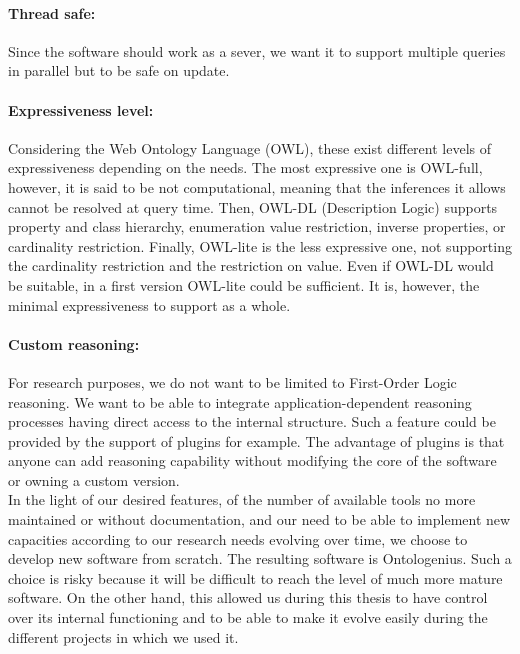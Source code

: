 \paragraph{Thread safe:} Since the software should work as a sever, we want it to support multiple queries in parallel but to be safe on update.

\paragraph{Expressiveness level:} Considering the Web Ontology Language (OWL), these exist different levels of expressiveness depending on the needs. The most expressive one is OWL-full, however, it is said to be not computational, meaning that the inferences it allows cannot be resolved at query time. Then, OWL-DL (Description Logic) supports property and class hierarchy, enumeration value restriction, inverse properties, or cardinality restriction. Finally, OWL-lite is the less expressive one, not supporting the cardinality restriction and the restriction on value. Even if OWL-DL would be suitable, in a first version OWL-lite could be sufficient. It is, however, the minimal expressiveness to support as a whole.

\paragraph{Custom reasoning:} For research purposes, we do not want to be limited to First-Order Logic reasoning. We want to be able to integrate application-dependent reasoning processes having direct access to the internal structure. Such a feature could be provided by the support of plugins for example. The advantage of plugins is that anyone can add reasoning capability without modifying the core of the software or owning a custom version.\\

In the light of our desired features, of the number of available tools no more maintained or without documentation, and our need to be able to implement new capacities according to our research needs evolving over time, we choose to develop new software from scratch. The resulting software is Ontologenius. Such a choice is risky because it will be difficult to reach the level of much more mature software. On the other hand, this allowed us during this thesis to have control over its internal functioning and to be able to make it evolve easily during the different projects in which we used it.

